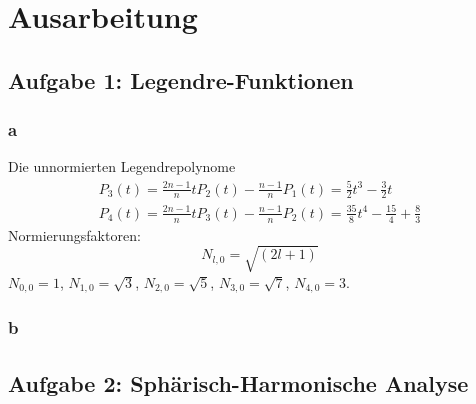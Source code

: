 \chapter{Ausarbeitung}
\section{Aufgabe 1: Legendre-Funktionen}
\subsection{a}
Die unnormierten Legendrepolynome
\begin{gather}
	P_3(t) = \frac{2n-1}{n} t P_2(t) - \frac{n-1}{n}P_1(t) = \frac{5}{2}t^3-\frac{3}{2}t \\
	P_4(t) = \frac{2n-1}{n} t P_3(t) - \frac{n-1}{n}P_2(t) = \frac{35}{8}t^4 - \frac{15}{4} + \frac{8}{3}
\end{gather}
Normierungsfaktoren:
\begin{equation}
	N_{l,0} = \sqrt{(2l+1)}	
\end{equation}
$N_{0,0} = 1$, $N_{1,0} = \sqrt{3}$, $N_{2,0} = \sqrt{5}$, $N_{3,0} = \sqrt{7}$, $N_{4,0} = 3$.
\subsection{b}

\clearpage
\section{Aufgabe 2: Sphärisch-Harmonische Analyse}
